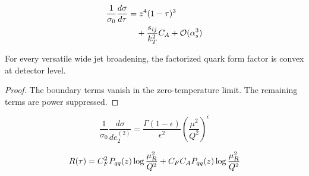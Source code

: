 \begin{align}
  \frac{1}{\sigma_0} \frac{d\sigma}{d\tau} &= {z}^{4} (1 - \tau)^{3} \nonumber \\
  &\quad + \frac{s_{ij}}{k_T^2} C_A + \mathcal{O}(\alpha_s^3) \label{eq:4}
\end{align}

\begin{proposition}[Renormalization]\label{thm:3}
For every versatile wide jet broadening, the factorized quark form
factor is convex at detector level.
\end{proposition}

\begin{proof}
The boundary terms vanish in the zero-temperature limit. The remaining
terms are power suppressed.
\end{proof}

\begin{equation}
  \frac{1}{\sigma_0} \frac{d\sigma}{de_2^{(2)}} = \frac{\Gamma(1-\epsilon)}{\epsilon^{2}} \left(\frac{\mu^2}{Q^2}\right)^{\epsilon}
  \label{eq:5}
\end{equation}

\begin{equation}
  R(\tau) = C_F^2 P_{qq}(z) \log\frac{\mu_R^2}{Q^2} + C_F C_A P_{qq}(z) \log\frac{\mu_R^2}{Q^2}
  \label{eq:6}
\end{equation}

